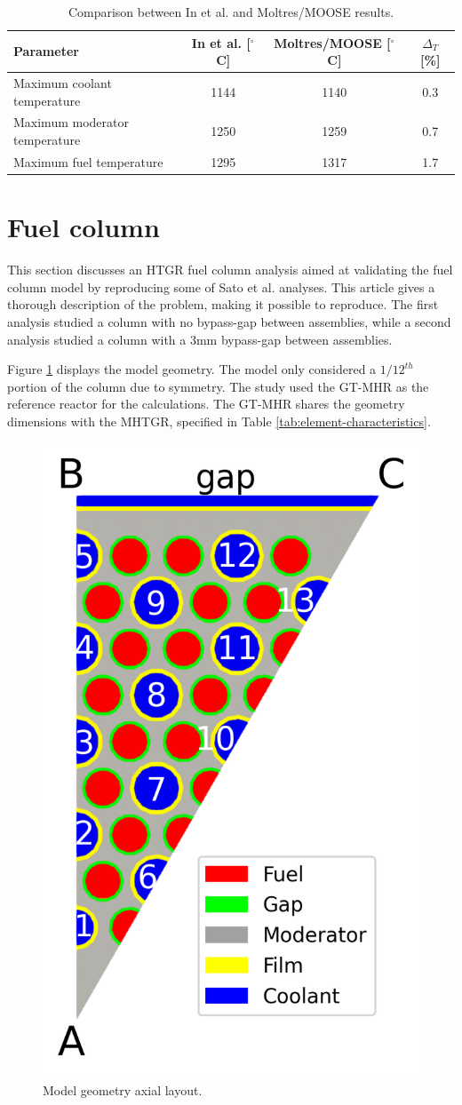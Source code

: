\begin{table}[htbp!]
\centering
    \caption{Comparison between In et al. \cite{in_three-dimensional_2006} and Moltres/MOOSE results.}
    \label{tab:th-val-unit-results}
    \begin{tabular}{@{}l c c c}
    \toprule
  Parameter                      & In et al. [$^{\circ}$C] & Moltres/MOOSE [$^{\circ}$C] & $\Delta_T$ [\%]\\
    \midrule
  Maximum coolant temperature    & 1144      & 1140          & 0.3 \\
  Maximum moderator temperature  & 1250      & 1259          & 0.7 \\
  Maximum fuel temperature       & 1295      & 1317          & 1.7 \\
    \bottomrule
  \end{tabular}
\end{table}

\section{Fuel column}
\label{sec:fuelcol}

This section discusses an HTGR fuel column analysis aimed at validating the fuel column model by reproducing some of Sato et al. \cite{sato_computational_2010} analyses.
This article gives a thorough description of the problem, making it possible to reproduce.
The first analysis studied a column with no bypass-gap between assemblies, while a second analysis studied a column with a 3mm bypass-gap between assemblies.

Figure \ref{fig:th-val-assem-model-a} displays the model geometry.
The model only considered a $1/12^{th}$ portion of the column due to symmetry.
The study used the GT-MHR as the reference reactor for the calculations.
The GT-MHR shares the geometry dimensions with the MHTGR, specified in Table \ref{tab:element-characteristics}.

\begin{figure}[htbp!]
  \centering
  \includegraphics[width=0.25\linewidth]{figures-thermal/val-assem-mesh}
  \hfill
  \caption{Model geometry axial layout.}
  \label{fig:th-val-assem-model-a}
\end{figure}

